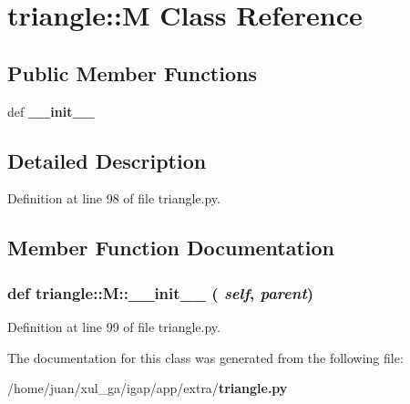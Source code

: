 \section{triangle::M Class Reference}
\label{classtriangle_1_1M}
\subsection*{Public Member Functions}
\begin{CompactItemize}
\item 
def {\bf \_\-\_\-init\_\-\_\-}
\end{CompactItemize}


\subsection{Detailed Description}


Definition at line 98 of file triangle.py.

\subsection{Member Function Documentation}
\subsubsection{\setlength{\rightskip}{0pt plus 5cm}def triangle::M::\_\-\_\-init\_\-\_\- ( {\em self},  {\em parent})}\label{classtriangle_1_1M_624c041eeba25546a0c961220f6b8f27}




Definition at line 99 of file triangle.py.

The documentation for this class was generated from the following file:\begin{CompactItemize}
\item 
/home/juan/xul\_\-ga/igap/app/extra/{\bf triangle.py}\end{CompactItemize}
